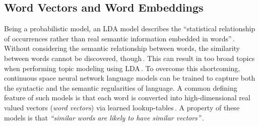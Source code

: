 \subsection{Word Vectors and Word Embeddings}
Being a probabilistic model, an LDA model describes the ``statistical relationship of occurrences rather than real semantic information embedded in words''\,\cite{niu_topic2vec_2015}. Without considering the semantic relationship between words, the similarity between words cannot be discovered, though\,\cite{mikolov_efficient_2013}. This can result in too broad topics when performing topic modeling using LDA\,\cite{niu_topic2vec_2015}. To overcome this shortcoming, continuous space neural network language models can be trained to capture both the syntactic and the semantic regularities of language. A common defining feature of such models is that each word is converted into high-dimensional real valued vectors (\textit{word vectors}) via learned lookup-tables\,\cite{mikolov_linguistic_2013}. A property of these models is that \textit{``similar words are likely to have similar vectors''}\,\cite{mikolov_linguistic_2013}. 



